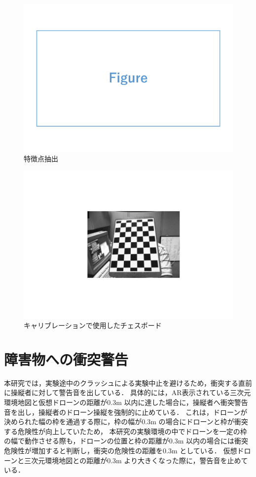 \documentclass[a4paper,11pt]{ujreport}
\begin{document}
\begin{figure}[!tb]
  \centering
  \includegraphics[width=0.7\linewidth]{img/sample.pdf}
  \caption{特徴点抽出}
  \label{fig:04_feature}
\end{figure}

\begin{figure}[!tb]
  \centering
  \includegraphics[width=0.7\linewidth]{img/04_calibration.pdf}
  \caption{キャリブレーションで使用したチェスボード}
  \label{fig:04_calibration}
\end{figure}


\section{障害物への衝突警告}
\label{sec:CollisionWarning}

本研究では，実験途中のクラッシュによる実験中止を避けるため，衝突する直前に操縦者に対して警告音を出している．
具体的には，AR表示されている三次元環境地図と仮想ドローンの距離が0.3m 以内に達した場合に，操縦者へ衝突警告音を出し，操縦者のドローン操縦を強制的に止めている．
これは，ドローンが決められた幅の枠を通過する際に，枠の幅が0.3m の場合にドローンと枠が衝突する危険性が向上していたため\cite{tech-01}，
本研究の実験環境の中でドローンを一定の枠の幅で動作させる際も，ドローンの位置と枠の距離が0.3m 以内の場合には衝突危険性が増加すると判断し，衝突の危険性の距離を0.3m としている．
仮想ドローンと三次元環境地図との距離が0.3m より大きくなった際に，警告音を止めている．
\end{document}
